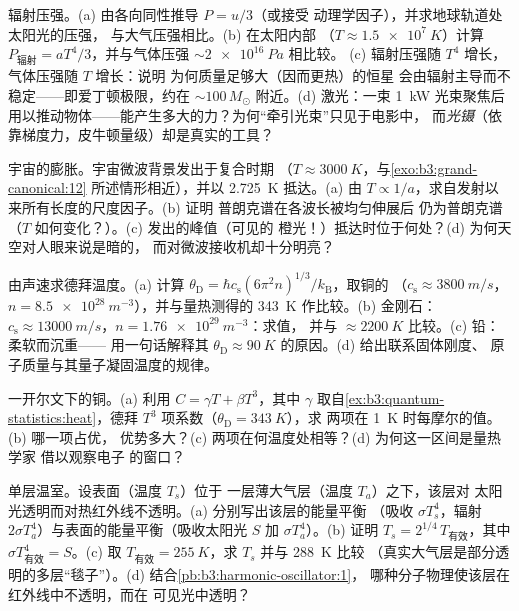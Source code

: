 \begin{exercise}[$\star\star$]\label{exo:b3:photons-phonons:5}
辐射压强。(a) 由各向同性推导 $P = u/3$（或接受
动理学因子），并求地球轨道处太阳光的压强，
与大气压强相比。(b) 在太阳内部
（$T \approx \qty{1.5e7}{K}$）计算 $P_{\text{辐射}} =
aT^4/3$，并与气体压强 $\sim\qty{2e16}{Pa}$ 相比较。
(c) 辐射压强随 $T^4$ 增长，气体压强随 $T$ 增长：说明
为何质量足够大（因而更热）的恒星
会由辐射主导而不稳定——即爱丁顿极限，约在
$\sim100\,M_\odot$ 附近。(d) 激光：一束 \qty{1}{kW} 光束聚焦后
用以推动物体——能产生多大的力？为何“牵引光束”只见于电影中，
而\emph{光镊}（依靠梯度力，皮牛顿量级）却是真实的工具？
\end{exercise}

\begin{exercise}[$\star\star$]\label{exo:b3:photons-phonons:6}
宇宙的膨胀。宇宙微波背景发出于复合时期
（$T \approx \qty{3000}{K}$，与\cref{exo:b3:grand-canonical:12}
所述情形相近），并以 \qty{2.725}{K} 抵达。(a) 由 $T \propto
1/a$，求自发射以来所有长度的尺度因子。(b) 证明
普朗克谱在各波长被均匀伸展后
仍为普朗克谱（$T$ 如何变化？）。(c) 发出的峰值（可见的
橙光！）抵达时位于何处？(d) 为何天空对人眼来说是暗的，
而对微波接收机却十分明亮？
\end{exercise}

\begin{exercise}[$\star\star$]\label{exo:b3:photons-phonons:7}
由声速求德拜温度。(a) 计算 $\theta_{\text{D}} =
\hbar c_{\text{s}}(6\pi^2n)^{1/3}/k_{\text{B}}$，取铜的
（$c_{\text{s}} \approx \qty{3800}{m/s}$，$n =
\qty{8.5e28}{m^{-3}}$），并与量热测得的
\qty{343}{K} 作比较。(b) 金刚石：$c_{\text{s}} \approx
\qty{13000}{m/s}$，$n = \qty{1.76e29}{m^{-3}}$：求值，
并与 $\approx\qty{2200}{K}$ 比较。(c) 铅：柔软而沉重——
用一句话解释其 $\theta_{\text{D}} \approx \qty{90}{K}$
的原因。(d) 给出联系固体刚度、
原子质量与其量子凝固温度的规律。
\end{exercise}

\begin{exercise}[$\star\star$]\label{exo:b3:photons-phonons:8}
一开尔文下的铜。(a) 利用 $C = \gamma T + \beta T^3$，其中
$\gamma$ 取自\cref{ex:b3:quantum-statistics:heat}，德拜
$T^3$ 项系数（$\theta_{\text{D}} = \qty{343}{K}$），求
两项在 \qty{1}{K} 时每摩尔的值。(b) 哪一项占优，
优势多大？(c) 两项在何温度处相等？(d) 为何这一区间是量热学家
借以观察电子
的窗口？
\end{exercise}

\begin{exercise}[$\star\star$]\label{exo:b3:photons-phonons:9}
单层温室。设表面（温度 $T_s$）位于
一层薄大气层（温度 $T_a$）之下，该层对
太阳光透明而对热红外线不透明。(a) 分别写出该层的能量平衡
（吸收 $\sigma T_s^4$，辐射
$2\sigma T_a^4$）与表面的能量平衡（吸收太阳光 $S$ 加
$\sigma T_a^4$）。(b) 证明 $T_s = 2^{1/4}\,T_{\text{有效}}$，其中
$\sigma T_{\text{有效}}^4 = S$。(c) 取 $T_{\text{有效}} =
\qty{255}{K}$，求 $T_s$ 并与 \qty{288}{K} 比较
（真实大气层是部分透明的多层“毯子”）。(d)
结合\cref{pb:b3:harmonic-oscillator:1}，
哪种分子物理使该层在红外线中不透明，而在
可见光中透明？
\end{exercise}


